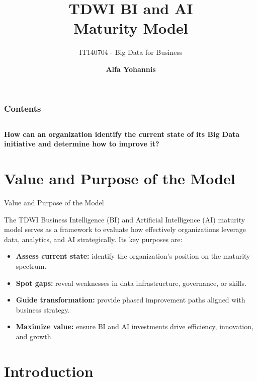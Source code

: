 \documentclass[aspectratio=169, table]{beamer}
\title{\Huge TDWI BI and AI \\
\vspace{10pt}
 Maturity Model}
\subtitle{IT140704 - Big Data for Business}
\author{\textbf{Alfa Yohannis}}
\begin{document}
\frame{\titlepage}


\begin{frame}[fragile]
\frametitle{Contents}
\vspace{20pt}
\begin{columns}[t]
	\tableofcontents[sections={1-5}]
	
	\tableofcontents[sections={6-20}]
\end{columns}
\end{frame}

\begin{frame}{\hfill}
	\centering
	\Huge{\textbf{How can an organization identify the current state of its Big Data initiative and determine how to improve it?}}
\end{frame}


\section{Value and Purpose of the Model}

\begin{frame}{Value and Purpose of the Model}
	\vspace{20pt}
	
	The TDWI Business Intelligence (BI) and Artificial Intelligence (AI) maturity model 
	serves as a framework to evaluate how effectively organizations leverage data, analytics, 
	and AI strategically. Its key purposes are:
	
	\begin{itemize}
		\item \textbf{Assess current state:} identify the organization’s position on the maturity spectrum.
		\item \textbf{Spot gaps:} reveal weaknesses in data infrastructure, governance, or skills.
		\item \textbf{Guide transformation:} provide phased improvement paths aligned with business strategy.
		\item \textbf{Maximize value:} ensure BI and AI investments drive efficiency, innovation, and growth.
	\end{itemize}
	
\end{frame}

\section{Introduction}
\end{document}
